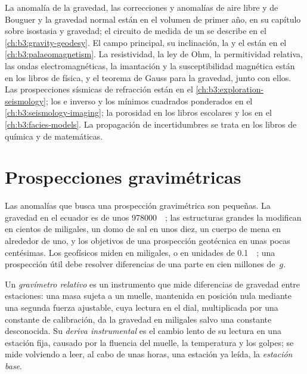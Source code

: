 \begin{recall}
La anomalía de la gravedad, las correcciones y anomalías de aire libre y de Bouguer
y la gravedad normal están en el volumen de primer año, en su capítulo sobre isostasia
y gravedad; el circuito de medida de un  se describe en
el \cref{ch:b3:gravity-geodesy}. El campo principal, su inclinación, la
 y el  están en
el \cref{ch:b3:palaeomagnetism}. La resistividad, la ley de Ohm, la
permitividad relativa, las ondas electromagnéticas, la imantación y la
susceptibilidad magnética están en los libros de física, y el teorema de Gauss
para la gravedad, junto con ellos. Las prospecciones sísmicas de refracción están en
el \cref{ch:b3:exploration-seismology}; los  e inverso y los
mínimos cuadrados ponderados en el \cref{ch:b3:seismology-imaging}; la porosidad en
los libros escolares y los  en el \cref{ch:b3:facies-models}. La
propagación de incertidumbres se trata en los libros de química y de matemáticas.
\end{recall}

\section{Prospecciones gravimétricas}\label{sec:b3:field-lab-methods-3:gravity}

Las anomalías que busca una prospección gravimétrica son pequeñas. La gravedad en el
ecuador es de unos \qty{978000}{\milli\gal}; las estructuras grandes la modifican
en cientos de miligales, un domo de sal en unos diez, un cuerpo de mena en
alrededor de uno, y los objetivos de una prospección geotécnica en unas pocas
centésimas. Los geofísicos miden en
miligales, o en unidades de \qty{0.1}{\milli\gal}; una prospección útil
debe resolver diferencias de una parte en cien millones de~$g$.

\begin{definition}\label{def:b3:field-lab-methods-3:gravimeter}
Un \emph{gravímetro relativo} es un
instrumento que mide diferencias de gravedad entre estaciones: una
masa sujeta a un muelle, mantenida en posición nula mediante una segunda fuerza
ajustable, cuya lectura en el dial, multiplicada por una constante de calibración, da
la gravedad en miligales salvo una constante desconocida. Su \emph{deriva
instrumental} es el cambio lento de su lectura en una
estación fija, causado por la fluencia del muelle, la temperatura y los
golpes; se mide volviendo a leer, al cabo de unas horas, una estación ya leída, la
\emph{estación base}.
\end{definition}

